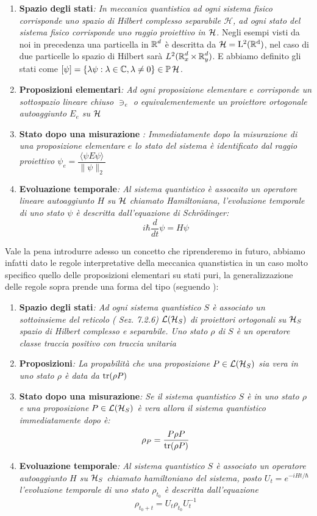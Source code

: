 \begin{enumerate}
    \item \textbf{Spazio degli stati}\emph{: In meccanica quantistica ad ogni sistema fisico corrisponde uno spazio di Hilbert complesso separabile $\mathcal{H}$, ad ogni stato del sistema fisico corrisponde uno raggio proiettivo in $\operatorname{\mathcal{H}}$. } Negli esempi visti da noi in precedenza una particella in $\operatorname{\mathbb{R}}^d$ è descritta da $\operatorname{\mathcal{H}} = \operatorname{L^2(\mathbb{R}^d)}$, nel caso di due particelle lo spazio di Hilbert sarà $L^2(\operatorname{\mathbb{R}}^d_x \times \operatorname{\mathbb{R}}^d_y)$. E abbiamo definito gli stati come $[ \psi] = \{ \lambda \psi : \lambda \in \mathbb{C}, \lambda \neq 0\} \in \mathbb{P}\operatorname{\mathcal{H}}$.
    \item \textbf{Proposizioni elementari}\emph{: Ad ogni proposizione elementare $e$ corrisponde un sottospazio lineare chiuso $\ni_e$ o equivalementemente un proiettore ortogonale autoaggiunto $E_e$ su $\operatorname{\mathcal{H}}$}
    \item \textbf{Stato dopo una misurazione} \emph{: Immediatamente dopo la misurazione di una proposizione elementare $e$ lo stato del sistema è identificato dal raggio proiettivo $\psi_e = \dfrac{\langle \psi E \psi \rangle}{\|\psi\|_2}$}
    \item \textbf{Evoluazione temporale}\emph{: Al sistema quantistico è assocaito un operatore lineare autoaggiunto $H$ su $\operatorname{\mathcal{H}}$ chiamato Hamiltoniana, l'evoluzione temporale di uno stato $\psi$ è descritta dall'equazione di Schrödinger: $$i \hbar \dfrac{d}{dt} \psi = H \psi$$}
\end{enumerate}
Vale la pena introdurre adesso un concetto che riprenderemo in futuro, abbiamo infatti dato le regole interpretative della meccanica quanstistica in un caso molto specifico quello delle proposizioni elementari su stati puri, la generalizzazione delle regole sopra prende una forma del tipo (seguendo \cite{Mor}):
\begin{enumerate}
    \item \textbf{Spazio degli stati}\emph{: Ad ogni sistema quantistico $S$ è associato un sottoinsieme del reticolo (\cite{Mor} Sez. 7.2.6) $\mathcal{L}(\operatorname{\mathcal{H}}_S)$ di proiettori ortogonali su $\operatorname{\mathcal{H}}_S$ spazio di Hilbert complesso e separabile. Uno stato $\rho$ di $S$ è un operatore classe traccia positivo con traccia unitaria}
    \item \textbf{Proposizioni}\emph{: La propabilità che una proposizione $P \in \mathcal{L}(\operatorname{\mathcal{H}}_S)$ sia vera in uno stato $\rho$ è data da $\tr(\rho P)$}
    \item \textbf{Stato dopo una misurazione}\emph{: Se il sistema quantistico $S$ è in uno stato $\rho$ e una proposizione $P \in \mathcal{L}(\operatorname{\mathcal{H}}_S)$ è vera allora il sistema quantistico immediatamente dopo è: $$\rho_P = \dfrac{P \rho P}{\tr(\rho P)}$$}
    \item \textbf{Evoluazione temporale}\emph{: Al sistema quantistico $S$ è associato un operatore autoaggiunto $H$ su $\operatorname{\mathcal{H}}_S$ chiamato hamiltoniano del sistema, posto $U_t = e^{-iHt/\hbar}$ l'evoluzione temporale di uno stato $\rho_{t_0}$ è descritta dall'equazione $$\rho_{t_0 + t} = U_t \rho_{t_0} U_t^{-1}$$}
\end{enumerate}